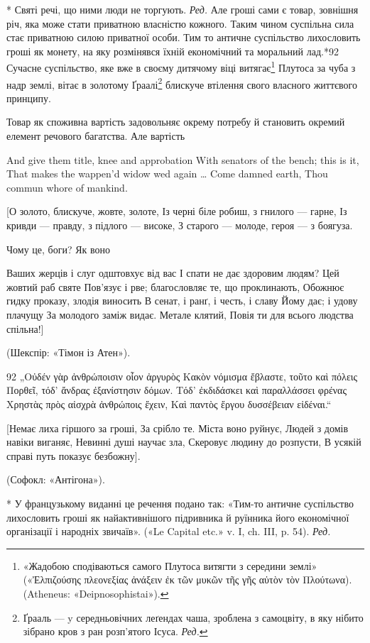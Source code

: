 * Святі речі, що ними люди не торгують. \emph{Ред.}
Але гроші сами є товар, зовнішня річ, яка може стати приватною
власністю кожного. Таким чином суспільна сила стає приватною
силою приватної особи. Тим то античне суспільство лихословить
гроші як монету, на яку розмінявся їхній економічний та моральний
лад.*92 Сучасне суспільство, яке вже в своєму дитячому
віці витягає\footnote{
«Жадобою сподіваються самого Плутоса витягти з середини землі»
(«Ἐλπιζούσης  πλεονεξίας ἀνάξειν ἐκ τῶν μυκῶν τῆς γῆς αὐτὸν τὸν Πλούτωνα). (Atheneus:
«Deipnosophistai»).
} Плутоса за чуба з надр землі, вітає в золотому
Ґраалі\footnote*{
Ґрааль — y середньовічних леґендах чаша, зроблена з самоцвіту,
в яку нібито зібрано кров з ран розп’ятого Ісуса. \emph{Ред.}
} блискуче втілення свого власного життєвого принципу.

Товар як споживна вартість задовольняє окрему потребу й
становить окремий елемент речового багатства. Але вартість

And give them title, knee and approbation
With senators of the bench; this is it,
That makes the wappen’d widow wed again
\dots{} Come damned earth,
Thou commun whore of mankind.

[О золото, блискуче, жовте, золоте,
Із черні біле робиш, з гнилого — гарне,
Із кривди — правду, з підлого — високе,
З старого — молоде, героя — з боягуза.

Чому це, боги? Як воно

Ваших жерців і слуг одштовхує від вас
І спати не дає здоровим людям?
Цей жовтий раб святе
Пов’язує і рве; благословляє те, що
проклинають,
Обожнює гидку проказу, злодія виносить
В сенат, і ранґ, і честь, і славу
Йому дає; і удову плачущу
За молодого заміж видає.
Метале клятий,
Повія ти для всього людства спільна!]

(Шекспір: «Тімон із Атен»).

92 „Οὐδέν γὰρ ἀνθρώποισιν οἷον ἀργυρὸς
Κακὸν νόμισμα ἔβλαστε, τοῦτο καὶ πόλεις
Πορθεῖ, τόδ’ ἄνδρας ἐξανίστησιν δόμων.
Τόδ’ ἐκδιδάσκει καὶ παραλλάσσει φρένας
Χρηστὰς πρὸς αἰσχρὰ ἀνθρώποις ἔχειν,
Καὶ παντὸς ἔργου δυσσέβειαν εἰδέναι.“

[Немає лиха гіршого за гроші,
За срібло те. Міста воно руйнує,
Людей з домів навіки виганяє,
Невинні душі научає зла,
Скеровує людину до розпусти,
В усякій справі путь показує безбожну].

(Софокл: «Антігона»).

* У французькому виданні це речення подано так: «Тим-то
античне
суспільство лихословить гроші як найактивнішого підривника й руїнника
його економічної організації і народніх звичаїв». («Le Capital etc.» v. I,
ch. III, p. 54). \emph{Ред.}
\parbreak{}  %
